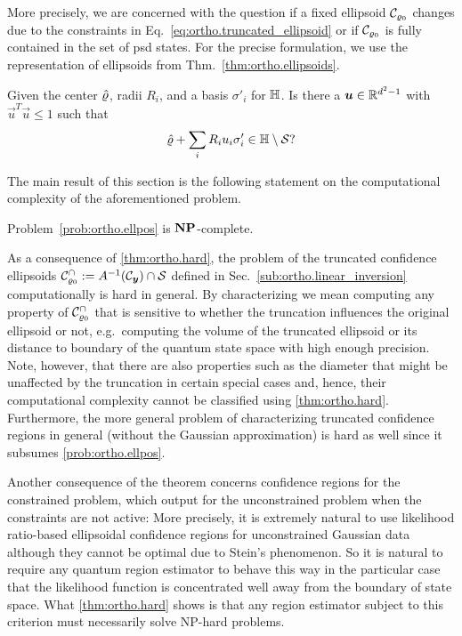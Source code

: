 More precisely, we are concerned with the question if a fixed ellipsoid $\mathcal{C}_{\varrho_0}$ changes due to the constraints in Eq.~\eqref{eq:ortho.truncated_ellipsoid} or if $\mathcal{C}_{\varrho_0}$ is fully contained in the set of psd states.
For the precise formulation, we use the representation of ellipsoids from Thm.~\ref{thm:ortho.ellipsoids}.
\begin{problem}\label{prob:ortho.ellpos}
  Given the center $\hat{\varrho}$, radii $R_i$, and a basis $\sigma'_i$ for $\mathbb{H}$.
  Is there a ${\boldsymbol{u}} \in {\mathbb{R}}^{d^2 - 1}$ with $\vec{u}^{T}\vec{u} \leq 1$ such that
  \[
    \label{eq:ortho.ellpos_condition}
    \hat{\varrho} + \sum_{i}R_{i}u_{i}\sigma_{i}' \in \mathbb{H} \setminus \mathcal{S}?
  \]
\end{problem}
The main result of this section is the following statement on the computational complexity of the aforementioned problem.
\begin{theorem}\label{thm:ortho.hard}
  Problem~\ref{prob:ortho.ellpos} is $\mathbf{NP}$-complete.
\end{theorem}
As a consequence of \cref{thm:ortho.hard}, the problem of  the truncated confidence ellipsoids $\mathcal{C}_{\varrho_0}^\cap := A^{-1}(\mathcal{C}_{\boldsymbol{y}}) \cap \mathcal{S}$ defined in Sec.~\ref{sub:ortho.linear_inversion} computationally is hard in general.
By characterizing we mean computing any property of $\mathcal{C}_{\varrho_0}^\cap$ that is sensitive to whether the truncation influences the original ellipsoid or not, e.g.\ computing the volume of the truncated ellipsoid or its distance to boundary of the quantum state space with high enough precision.
Note, however, that there are also properties such as the diameter that might be unaffected by the truncation in certain special cases and, hence, their computational complexity cannot be classified using \cref{thm:ortho.hard}.
Furthermore, the more general problem of characterizing truncated confidence regions in general (without the Gaussian approximation) is hard as well since it subsumes \cref{prob:ortho.ellpos}.

Another consequence of the theorem concerns confidence regions for the constrained problem, which output  for the unconstrained problem when the constraints are not active:
More precisely, it is extremely natural to use likelihood ratio-based ellipsoidal confidence regions for unconstrained Gaussian data although they cannot be optimal due to Stein's phenomenon.
So it is natural to require any quantum region estimator to behave this way in the particular case that the likelihood function is concentrated well away from the boundary of state space.
What \cref{thm:ortho.hard} shows is that any region estimator subject to this criterion must necessarily solve NP-hard problems.


